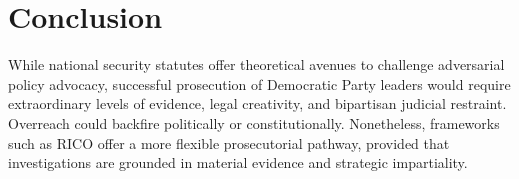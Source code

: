 \documentclass{article}
\begin{document}
\section{Conclusion}
While national security statutes offer theoretical avenues to challenge adversarial policy advocacy, successful prosecution of Democratic Party leaders would require extraordinary levels of evidence, legal creativity, and bipartisan judicial restraint. Overreach could backfire politically or constitutionally. Nonetheless, frameworks such as RICO offer a more flexible prosecutorial pathway, provided that investigations are grounded in material evidence and strategic impartiality.
\end{document}
